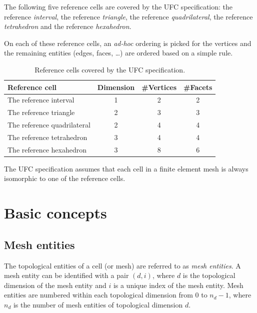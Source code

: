 The following five reference cells are covered by the UFC specification:
the reference \emph{interval},
the reference \emph{triangle},
the reference \emph{quadrilateral},
the reference \emph{tetrahedron} and
the reference \emph{hexahedron}.

On each of these reference cells, an \emph{ad-hoc} ordering is picked
for the vertices and the remaining entities (edges, faces, \ldots) are
ordered based on a simple rule.

\begin{table}[H]
\linespread{1.2}\selectfont
  \begin{center}
    \begin{tabular}{|l|c|c|c|}
      \hline
      Reference cell & Dimension & \#Vertices & \#Facets \\
      \hline
      \hline
      The reference interval      & 1 & 2 & 2 \\
      \hline
      The reference triangle      & 2 & 3 & 3 \\
      \hline
      The reference quadrilateral & 2 & 4 & 4 \\
      \hline
      The reference tetrahedron   & 3 & 4 & 4 \\
      \hline
      The reference hexahedron    & 3 & 8 & 6 \\
      \hline
    \end{tabular}
    \caption{Reference cells covered by the UFC specification.}
  \end{center}
\end{table}

The UFC specification assumes that each cell in a finite element mesh
is always isomorphic to one of the reference cells.

\section{Basic concepts}

\subsection{Mesh entities}

The topological entities of a cell (or mesh) are referred to as
\emph{mesh entities}. A mesh entity can be identified with a pair
$(d, i)$, where $d$ is the topological dimension of the mesh entity and $i$
is a unique index of the mesh entity. Mesh entities are numbered
within each topological dimension from $0$ to $n_d-1$, where $n_d$ is
the number of mesh entities of topological dimension $d$.

